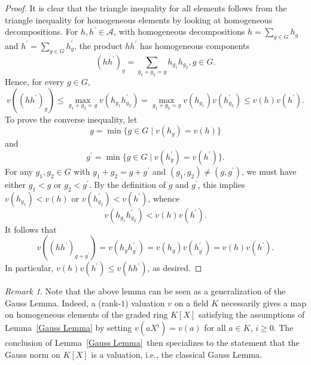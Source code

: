 \documentclass[12pt,twoside,a4paper]{article}
\theoremstyle{definition}
\theoremstyle{remark}
\newtheorem{rmk}[thm]{Remark}
\begin{document}
\begin{proof}It is clear that the triangle inequality for all elements follows from the triangle inequality for homogeneous elements by looking at homogeneous decompositions. For $h, h^{\prime}\in \mathcal{A}$, with homogeneous decompositions $h=\sum_{g\in G}h_{g}$ and $h^{\prime}=\sum_{g\in G}h_{g}^{\prime}$, the product $hh^{\prime}$ has homogeneous components \begin{equation*}(hh^{\prime})_{g}=\sum_{g_{1}+g_{2}=g}h_{g_{1}}h_{g_{2}}, g\in G.\end{equation*}Hence, for every $g\in G$, \begin{equation*}v((hh^{\prime})_{g})\leq \max_{g_{1}+g_{2}=g}v(h_{g_{1}}h_{g_{2}}^{\prime})=\max_{g_{1}+g_{2}=g}v(h_{g_{1}})v(h_{g_{2}}^{\prime})\leq v(h)v(h^{\prime}).\end{equation*}To prove the converse inequality, let \begin{equation*}g=\min\{g\in G\mid v(h_{g})=v(h)\}\end{equation*}and \begin{equation*}g^{\prime}=\min\{g\in G\mid v(h_{g}^{\prime})=v(h^{\prime})\}.\end{equation*}For any $g_1, g_2\in G$ with $g_{1}+g_{2}=g+g^{\prime}$ and $(g_1, g_2)\neq (g, g^{\prime})$, we must have either $g_{1}<g$ or $g_{2}<g^{\prime}$. By the definition of $g$ and $g^{\prime}$, this implies $v(h_{g_{1}})<v(h)$ or $v(h_{g_{2}}^{\prime})<v(h^{\prime})$, whence \begin{equation*}v(h_{g_{1}}h_{g_{2}}^{\prime})<v(h)v(h^{\prime}).\end{equation*}It follows that \begin{equation*}v((hh^{\prime})_{g+g^{\prime}})=v(h_{g}h_{g^{\prime}}^{\prime})=v(h_{g})v(h_{g^{\prime}}^{\prime})=v(h)v(h^{\prime}).\end{equation*}In particular, $v(h)v(h^{\prime})\leq v(hh^{\prime})$, as desired. \end{proof}
\begin{rmk}\label{Remark on the Gauss Lemma}Note that the above lemma can be seen as a generalization of the Gauss Lemma. Indeed, a (rank-$1$) valuation $v$ on a field $K$ necessarily gives a map on homogeneous elements of the graded ring $K[X]$ satisfying the assumptions of Lemma~\ref{Gauss Lemma} by setting $v(aX^{i})=v(a)$ for all $a\in K$, $i\geq0$. The conclusion of Lemma~\ref{Gauss Lemma} then specializes to the statement that the Gauss norm on $K[X]$ is a valuation, i.e., the classical Gauss Lemma.\end{rmk}   
\end{document}
